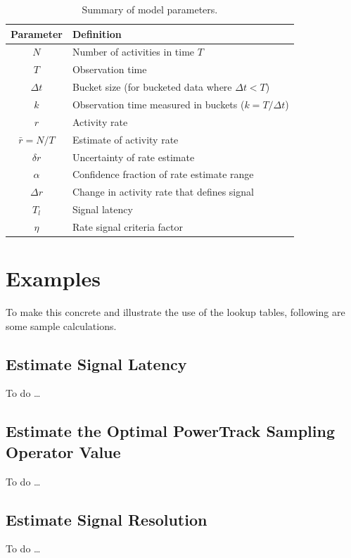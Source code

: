 \documentclass{article}
\begin{document}
\begin{table}
    \begin{tabular}{c| m{7cm}}
     \hline
Parameter  & Definition \\
\hline	
$N$ & Number of activities in time $T$\\
$T$ & Observation time\\
$\Delta t$ & Bucket size (for bucketed data where $\Delta t <T$) \\
$k$ & Observation time measured in buckets ($k=T/\Delta t$) \\
$r$ & Activity rate \\
$\bar{r} = N/T$ & Estimate of activity rate \\
$\delta r$ & Uncertainty of rate estimate \\
$\alpha$ & Confidence fraction of rate estimate range\\
$\Delta r$ & Change in activity rate that defines signal \\
$T_l$ & Signal latency \\
$\eta$ & Rate signal criteria factor \\
\hline
\end{tabular}
\caption{Summary of model parameters.}
\label{tab:summary}
\end{table}

\section{Examples}

To  make this concrete and illustrate the use of the lookup tables, following are some sample calculations.

\subsection{Estimate Signal Latency}

To do \ldots

\subsection{Estimate the Optimal PowerTrack Sampling Operator Value}

To do \ldots

\subsection{Estimate Signal Resolution}

To do \ldots
\end{document}
